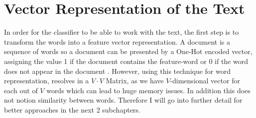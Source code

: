 \documentclass[a4paper, 11pt,titlepage,oneside,openany]{book}
\begin{document}

\section{Vector Representation of the Text}
In order for the classifier to be able to work with the text, the first step is to transform the words into a feature vector representation. A document is a sequence of words \cite{word2vecdortmund} so a document can be presented by a One-Hot encoded vector, assigning the value 1 if the document contains the feature-word or 0 if the word does not appear in the document \cite{textclassification}. However, using this technique for word representation, resolves in a $V \cdot V$ Matrix, as we have $V$-dimensional vector for each out of $V$ words which can lead to huge memory issues. In addition this does not notion similarity between words. Therefore I will go into further detail for better approaches in the next 2 subchapters.
\end{document}
